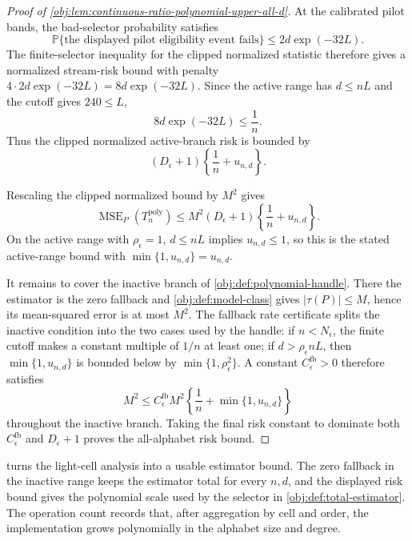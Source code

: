 \documentclass[11pt]{article}
\begin{document}
\begin{proof}[Proof of \cref{obj:lem:continuous-ratio-polynomial-upper-all-d}]
At the calibrated pilot bands, the bad-selector probability satisfies
\[
\mathbb P\{\text{the displayed pilot eligibility event fails}\}
\le 2d\exp(-32L).
\]
The finite-selector inequality for the clipped normalized statistic therefore gives a normalized stream-risk bound with penalty \(4\cdot 2d\exp(-32L)=8d\exp(-32L)\).  Since the active range has \(d\le nL\) and the cutoff gives \(240\le L\),
\[
8d\exp(-32L)\le \frac1n.
\]
Thus the clipped normalized active-branch risk is bounded by
\[
(D_\epsilon+1)\left\{\frac1n+u_{n,d}\right\}.
\]

Rescaling the clipped normalized bound by \(M^2\) gives
\[
\operatorname{MSE}_{P}(T_n^{\mathrm{poly}})
\le
M^2(D_\epsilon+1)\left\{\frac1n+u_{n,d}\right\}.
\]
On the active range with \(\rho_\epsilon=1\), \(d\le nL\) implies \(u_{n,d}\le1\), so this is the stated active-range bound with \(\min\{1,u_{n,d}\}=u_{n,d}\). %

It remains to cover the inactive branch of \cref{obj:def:polynomial-handle}.  There the estimator is the zero fallback and \cref{obj:def:model-class} gives \(|\tau(P)|\le M\), hence its mean-squared error is at most \(M^2\).  The fallback rate certificate splits the inactive condition into the two cases used by the handle: if \(n<N_\epsilon\), the finite cutoff makes a constant multiple of \(1/n\) at least one; if \(d>\rho_\epsilon nL\), then \(\min\{1,u_{n,d}\}\) is bounded below by \(\min\{1,\rho_\epsilon^2\}\).  A constant \(C_{\epsilon}^{\mathrm{fb}}>0\) therefore satisfies
\[
M^2
\le
C_{\epsilon}^{\mathrm{fb}}M^2
\left\{\frac1n+\min\{1,u_{n,d}\}\right\}
\]
throughout the inactive branch.  Taking the final risk constant to dominate both \(C_{\epsilon}^{\mathrm{fb}}\) and \(D_\epsilon+1\) proves the all-alphabet risk bound. %
\end{proof}

 turns the light-cell analysis into a usable estimator bound. The zero fallback in the inactive range keeps the estimator total for every \(n,d\), and the displayed risk bound gives the polynomial scale used by the selector in \cref{obj:def:total-estimator}. The operation count records that, after aggregation by cell and order, the implementation grows polynomially in the alphabet size and degree.
\end{document}
